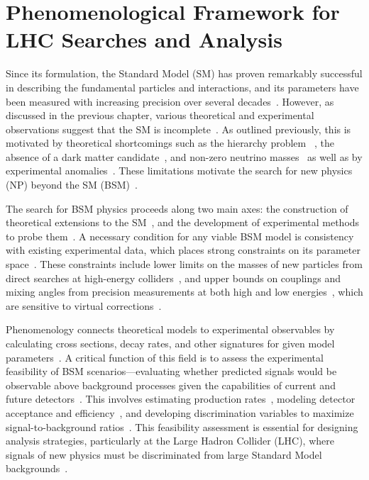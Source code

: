 \chapter[Phenomenological Framework]{Phenomenological Framework for LHC Searches and Analysis}

Since its formulation, the Standard Model (SM) has proven remarkably successful in describing the fundamental particles and interactions, and its parameters have been measured with increasing precision over several decades~\cite{1674-1137-40-10-100001,PhysRevLett.19.1264}. However, as discussed in the previous chapter, various theoretical and experimental observations suggest that the SM is incomplete~\cite{Nilles1984,Dorsner:2016wpm}. As outlined previously, this is motivated by theoretical shortcomings such as the hierarchy problem~\cite{Randall:1999ee,Giudice2013_review} , the absence of a dark matter candidate~\cite{Bertone2005_DM_review}, and non-zero neutrino masses~\cite{Mohapatra:1985xm} as well as by experimental anomalies~\cite{LHCb:2014vgu,LHCb:2017avl,BaBar:2012obs}. These limitations motivate the search for new physics (NP) beyond the SM (BSM)~\cite{Dorsner:2016wpm,Buttazzo:2017ixm}.

The search for BSM physics proceeds along two main axes: the construction of theoretical extensions to the SM~\cite{Dorsner:2016wpm,Buttazzo:2017ixm,Giudice2013_review}, and the development of experimental methods to probe them~\cite{Alwall:2014hca,Alloul:2013bka,deFavereau:2013fsa}. A necessary condition for any viable BSM model is consistency with existing experimental data, which places strong constraints on its parameter space~\cite{1674-1137-40-10-100001,ATLAS:2019erb,CMS:2021ctt}. These constraints include lower limits on the masses of new particles from direct searches at high-energy colliders~\cite{ATLAS:2019erb,CMS:2021ctt}, and upper bounds on couplings and mixing angles from precision measurements at both high and low energies~\cite{Schael_2006,Altmannshofer_2015}, which are sensitive to virtual corrections~\cite{Ciuchini:2022wbq}.


Phenomenology connects theoretical models to experimental observables by calculating cross sections, decay rates, and other signatures for given model parameters~\cite{Alwall:2014hca,Sjostrand:2014zea,Cacciari:2011ma}. A critical function of this field is to assess the experimental feasibility of BSM scenarios—evaluating whether predicted signals would be observable above background processes given the capabilities of current and future detectors~\cite{deFavereau:2013fsa,Alwall:2014hca,Alloul:2013bka}. This involves estimating production rates~\cite{Alwall:2014hca,Sjostrand:2014zea,NNPDF:2014otw}, modeling detector acceptance and efficiency~\cite{deFavereau:2013fsa,ATLAS:2008xda,CMS:2008xjf,lumiRef}, and developing discrimination variables to maximize signal-to-background ratios~\cite{pedregosa_scikit-learn_2011,Chen2016,Bols_2020,CMS_DeepTau}. This feasibility assessment is essential for designing analysis strategies, particularly at the Large Hadron Collider (LHC), where signals of new physics must be discriminated from large Standard Model backgrounds~\cite{deFavereau:2013fsa,Alwall:2014hca}.

